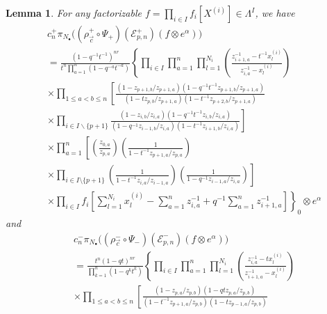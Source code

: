 \documentclass{amsart}
\newtheorem{lem}[thm]{Lemma}
\theoremstyle{remark}
\numberwithin{thm}{section}
\numberwithin{equation}{section}
\begin{document}
\begin{lem}\label{LemEFConstTerm}
For any factorizable $f=\prod_{i\in I}f_i[X^{(i)}]\in\Lambda^I$, we have
\begin{equation}
\begin{aligned}
&c_n^+
\pi_{N_\bullet}\biggl( (\rho_{\vec{c}}^+\circ\Psi_+)(\mathcal{E}_{p,n}^+)(f\otimes e^\alpha)\biggr)\\
&=\frac{(1-q^{-1}t^{-1})^{nr}}{t^{n}\prod_{a=1}^n(1-q^{-a}t^{-a})}
\left\{\prod_{i\in I}\prod_{a=1}^n\prod_{l=1}^{N_i}\left(\frac{ z_{i+1,a}^{-1}-t^{-1}x_{l}^{(i)} }{ z_{i,a}^{-1}-x_{l}^{(i)} }\right)\right.\\
&\times\prod_{1\le a<b\le n}
\left[
\frac{\left(1-z_{p+1,b}/z_{p+1,a}\right)\left(1-q^{-1}t^{-1}z_{p+1,b}/z_{p+1,a}\right)}{\left(1-tz_{p,b}/z_{p+1,a}\right)\left(1-t^{-1}z_{p+2,b}/z_{p+1,a}\right)}\right.\\
&\times\left.\prod_{i\in I\backslash\{p+1\}}
\frac{\left(1-z_{i,b}/z_{i,a}\right)\left(1-q^{-1}t^{-1}z_{i,b}/z_{i,a}\right)}{\left(1-q^{-1}z_{i-1,b}/z_{i,a}\right)\left(1-t^{-1}z_{i+1,b}/z_{i,a}\right)}\right]\\
&\times\prod_{a=1}^n \left[
\left(\frac{z_{0,a}}{z_{p,a}}\right)\left(\frac{1}{1-t^{-1}z_{p+1,a}/z_{p,a}}\right)\right.\\
&\times\left.
\prod_{i\in I\setminus\{p+1\}}
\left(\frac{1}{1-t^{-1}z_{i,a}/z_{i-1,a}}\right)
\left( \frac{1}{1-q^{-1}z_{i-1,a}/z_{i,a}} \right)\right]\\
&\left.\times
\prod_{i\in I}
f_i\left[ \sum_{l=1}^{N_i} x_{l}^{(i)}-\sum_{a=1}^nz_{i,a}^{-1}+q^{-1}\sum_{a=1}^n z_{i+1,a}^{-1} \right]
\right\}_0\otimes e^\alpha
\end{aligned}
\label{EConstTerm}
\end{equation}
and
\begin{equation}
\label{FConstTerm}
\begin{aligned}
&c_n^-\pi_{N_\bullet}\biggl((\rho_{\vec{c}}^-\circ\Psi_-)(\mathcal{E}_{p,n}^-)(f\otimes e^\alpha)\biggr)\\
&=\frac{t^n(1-qt)^{nr}}{\prod_{k=1}^n(1-q^kt^k)} 
\left\{\prod_{i\in I}\prod_{a=1}^n\prod_{l=1}^{N_i}\left(\frac{  z_{i,a}^{-1}-tx_{l}^{(i)} }{ z_{i+1,a}^{-1}-x_{l}^{(i)} }\right)\right.\\
&\times\prod_{1\le a<b\le n}\left[
\frac{\left(1-z_{p,a}/z_{p,b}\right)\left(1-qtz_{p,a}/z_{p,b}\right)}{\left(1-t^{-1}z_{p+1,a}/z_{p,b}\right)\left(1-tz_{p-1,a}/z_{p,b}\right)}\right.\\

\end{aligned}
\end{equation}
\end{lem}
\end{document}
